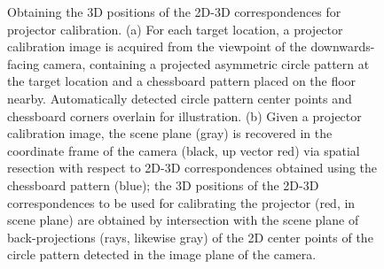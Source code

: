 \documentclass[review]{elsarticle}
\begin{document}
\begin{figure}[ht]
    \centering
    \qquad
    \caption{Obtaining the 3D positions of the 2D-3D correspondences for projector calibration. (a) For each target location, a projector calibration image is acquired from the viewpoint of the downwards-facing camera, containing a projected asymmetric circle pattern at the target location and a chessboard pattern placed on the floor nearby. Automatically detected circle pattern center points and chessboard corners overlain for illustration. (b) Given a projector calibration image, the scene plane (gray) is recovered in the coordinate frame of the camera (black, up vector red) via spatial resection with respect to 2D-3D correspondences obtained using the chessboard pattern (blue); the 3D positions of the 2D-3D correspondences to be used for calibrating the projector (red, in scene plane) are obtained by intersection with the scene plane of back-projections (rays, likewise gray) of the 2D center points of the circle pattern detected in the image plane of the camera.} %
    \label{fig:2d}
\end{figure}
\end{document}
